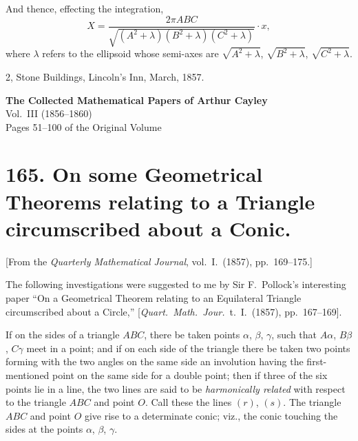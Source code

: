 \documentclass[11pt,a4paper]{book}
\begin{document}
And thence, effecting the integration,
\[
X = \frac{2\pi ABC}{\sqrt{(A^2+\lambda)(B^2+\lambda)(C^2+\lambda)}} \cdot x,
\]
where $\lambda$ refers to the ellipsoid whose semi-axes are $\sqrt{A^2+\lambda}$, $\sqrt{B^2+\lambda}$, $\sqrt{C^2+\lambda}$.

\begin{flushright}
2, Stone Buildings, Lincoln's Inn, March, 1857.
\end{flushright}

\clearpage
\clearpage


\begin{center}
{\Large\bfseries The Collected Mathematical Papers of Arthur Cayley}\\[6pt]
{\large Vol.~III (1856--1860)}\\[12pt]
{\large Pages 51--100 of the Original Volume}
\end{center}

\vspace{1em}


\section*{165. On some Geometrical Theorems relating to a Triangle circumscribed about a Conic.}

[From the \textit{Quarterly Mathematical Journal}, vol.~I.~(1857), pp.~169--175.]

The following investigations were suggested to me by Sir F.~Pollock's interesting paper ``On a Geometrical Theorem relating to an Equilateral Triangle circumscribed about a Circle,'' [\textit{Quart.\ Math.\ Jour.}\ t.~I.~(1857), pp.~167--169].

If on the sides of a triangle $ABC$, there be taken points $\alpha$, $\beta$, $\gamma$, such that $A\alpha$, $B\beta$, $C\gamma$ meet in a point; and if on each side of the triangle there be taken two points forming with the two angles on the same side an involution having the first-mentioned point on the same side for a double point; then if three of the six points lie in a line, the two lines are said to be \textit{harmonically related} with respect to the triangle $ABC$ and point $O$. Call these the lines $(r)$, $(s)$. The triangle $ABC$ and point $O$ give rise to a determinate conic; viz., the conic touching the sides at the points $\alpha$, $\beta$, $\gamma$.
\end{document}
